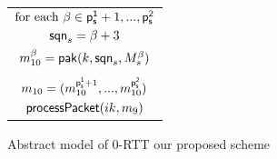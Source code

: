 \begin{figure*}[!htp]
\begin{center}
\begin{enumerate}
{\begin{minipage}[t]{0.38\textwidth}
   \centering
   \begin{tabular}{c}
    $\text{for each } \beta \in {\ensuremath{\mathsf{p_s^{1}}}+1,...,\ensuremath{\mathsf{p_s^{2}}}}$ \\
    $\mathsf{sqn}_s = \beta + 3$ \\
    $m_{10}^{\beta} = \mathsf{pak}(k, \mathsf{sqn}_s, M_s^{\beta})$ \\
    $ $ \\
    $m_{10} = (m_{10}^{\mathsf{p_s^{1}}+1},...,m_{10}^{\mathsf{p_s^{2}}})$ \\
    $\mathsf{processPacket}(ik, m_{9})$ \\
   \end{tabular}
  \end{minipage}%
 }
\end{enumerate}
 \caption{Abstract model of 0-RTT our proposed scheme}\label{fig:quic_prop_0rtt}
 \end{center}
\end{figure*}